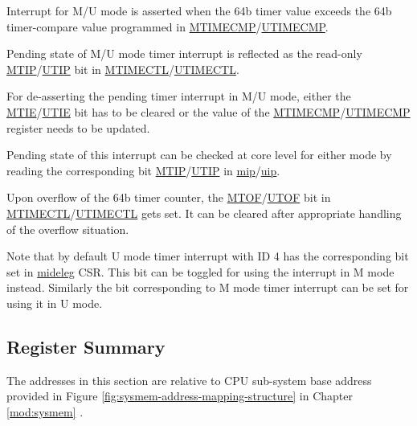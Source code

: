 \documentclass[main\_\_EN.tex]{subfiles}
\begin{document}
Interrupt for M/U mode is asserted when the 64b timer value exceeds the 64b timer-compare value programmed in \hyperref[regdesc:CLINTMTIMECMPREG]{MTIMECMP}/\hyperref[regdesc:CLINTUTIMECMPREG]{UTIMECMP}.

Pending state of M/U mode timer interrupt is reflected as the read-only \hyperref[fielddesc:CLINTMTIMECTLMTIP]{MTIP}/\hyperref[fielddesc:CLINTUTIMECTLUTIP]{UTIP} bit in \hyperref[regdesc:CLINTMTIMECTLREG]{MTIMECTL}/\hyperref[regdesc:CLINTUTIMECTLREG]{UTIMECTL}.

For de-asserting the pending timer interrupt in M/U mode, either the \hyperref[fielddesc:CLINTMTIMECTLMTIE]{MTIE}/\hyperref[fielddesc:CLINTUTIMECTLUTIE]{UTIE} bit has to be cleared or the value of the \hyperref[regdesc:CLINTMTIMECMPREG]{MTIMECMP}/\hyperref[regdesc:CLINTUTIMECMPREG]{UTIMECMP} register needs to be updated.

Pending state of this interrupt can be checked at core level for either mode by reading the corresponding bit \hyperref[fielddesc:MIPMTIP]{MTIP}/\hyperref[fielddesc:UIPUTIP]{UTIP} in \hyperref[regdesc:MIP]{mip}/\hyperref[regdesc:UIP]{uip}.

Upon overflow of the 64b timer counter, the \hyperref[fielddesc:CLINTMTIMECTLMTOF]{MTOF}/\hyperref[fielddesc:CLINTUTIMECTLUTOF]{UTOF} bit in \hyperref[regdesc:CLINTMTIMECTLREG]{MTIMECTL}/\hyperref[regdesc:CLINTUTIMECTLREG]{UTIMECTL} gets set. It can be cleared after appropriate handling of the overflow situation.

Note that by default U mode timer interrupt with ID 4 has the corresponding bit set in \hyperref[regdesc:MIDELEG]{mideleg} CSR. This bit can be toggled for using the interrupt in M mode instead. Similarly the bit corresponding to M mode timer interrupt can be set for using it in U mode.


\hypertarget{riscvcpu-clint-reg-summ}{}
\subsection{Register Summary}
\label{sec:riscvcpu-clint-reg-summ}


The addresses in this section are relative to CPU sub-system base address provided in Figure \ref{fig:sysmem-address-mapping-structure} in Chapter \ref{mod:sysmem} \textit{}.


\end{document}
